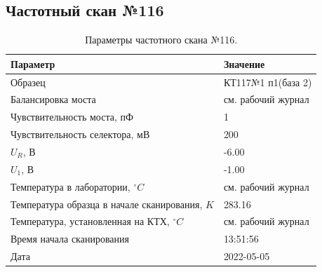 \subsection{Частотный скан №116}
\begin{table}[!ht]
    \centering
    \caption{Параметры частотного скана №116.}
    \begin{tabular}{|l|l|}
        \hline
        Параметр                                       & Значение                  \\ \hline
        Образец                                        & КТ117№1 п1(база 2)        \\ \hline
        Балансировка моста                             & см. рабочий журнал        \\ \hline
        Чувствительность моста, пФ                     & 1                         \\ \hline
        Чувствительность селектора, мВ                 & 200                       \\ \hline
        $U_R$, В                                       & -6.00                     \\ \hline
        $U_1$, В                                       & -1.00                     \\ \hline
        Температура в лаборатории, $^\circ C$          & см. рабочий журнал        \\ \hline
        Температура образца в начале сканирования, $K$ & 283.16                    \\ \hline
        Температура, установленная на КТХ, $^\circ C$  & см. рабочий журнал        \\ \hline
        Время начала сканирования                      & 13:51:56                  \\ \hline
        Дата                                           & 2022-05-05                \\ \hline
    \end{tabular}
    \label{table:frequency_scan_116}
\end{table}

